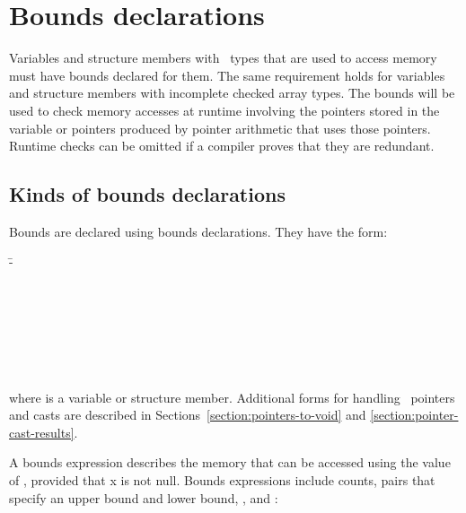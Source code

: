 
\chapter{Bounds declarations}
\label{chapter:tracking-bounds}

Variables and structure members with \arrayptr\ types that are used to access
memory must have bounds declared for them.  The same requirement
holds for variables and structure members with incomplete checked array types.
The bounds will be used to check
memory accesses at runtime involving the pointers stored in the variable
or pointers produced by pointer arithmetic that uses those pointers.
Runtime checks can be omitted if a compiler proves that they are
redundant.

\section{Kinds of bounds declarations}
\label{section:bounds-declarations}

Bounds are declared using bounds declarations. They have the form:

\begin{tabbing}
\=- \\
\>  \\
\\
 \\
\>  \\
\>  \\
\> \boundsunknown \\
\> \boundsany
\end{tabbing}

where  is a variable or structure member. Additional forms for handling
\void\ pointers and casts are described in
Sections~\ref{section:pointers-to-void} and \ref{section:pointer-cast-results}.

A bounds expression describes the memory that can be accessed using the
value of , provided that x is not null. Bounds expressions
include counts, pairs that specify an upper bound and lower bound,
\boundsunknown, and \boundsany:


